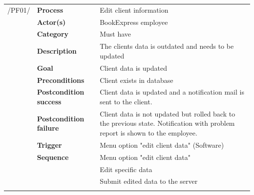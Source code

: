 \documentclass[11pt,a4paper,oneside,svgnames]{report}
\begin{document}
\noindent
\begin{tabular}{p{1.5cm}p{3cm}p{8cm}}
\cellcolor{white}/PF01/	& \textbf{Process} & Edit client information\\
\cellcolor{white}		& \textbf{Actor(s)} & BookExpress employee\\
\cellcolor{white}		& \textbf{Category} & Must have\\
\cellcolor{white}		& \textbf{Description}	 & The clients data is outdated and needs to be updated\\
\cellcolor{white}		& \textbf{Goal} & Client data is updated\\
\cellcolor{white}		& \textbf{Preconditions} & Client exists in database\\
\cellcolor{white}		& \textbf{Postcondition success} & Client data is updated and a notification mail is sent to the client.\\
\cellcolor{white}		& \textbf{Postcondition failure} & Client data is not updated but rolled back to the previous state. Notification with problem report is shown to the employee.\\
\cellcolor{white}		& \textbf{Trigger} & Menu option "edit client data" (Software)\\
\cellcolor{white}		& \textbf{Sequence} & Menu option "edit client data"\\
\cellcolor{white}		& & Edit specific data\\
\cellcolor{white}		& & Submit edited data to the server\\
\cellcolor{white}\hfill \\
\end{tabular}
\end{document}
